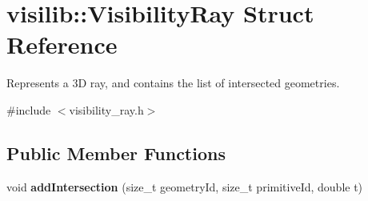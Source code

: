 \hypertarget{structvisilib_1_1_visibility_ray}{}\section{visilib\+::Visibility\+Ray Struct Reference}
\label{structvisilib_1_1_visibility_ray}


Represents a 3D ray, and contains the list of intersected geometries.  




{\ttfamily \#include $<$visibility\+\_\+ray.\+h$>$}

\subsection*{Public Member Functions}
\begin{DoxyCompactItemize}
\item 
\mbox{\label{structvisilib_1_1_visibility_ray_abdcc6b677206ac4226530a32f3ce58ec}} 
void {\bfseries add\+Intersection} (size\+\_\+t geometry\+Id, size\+\_\+t primitive\+Id, double t)
\end{DoxyCompactItemize}
